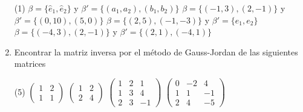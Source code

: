\documentclass[letterpaper,11pt]{article}
\begin{document}
\begin{enumerate}
\begin{tasks}(1)
\task $\beta = \lbrace \hat{e}_{1},\hat{e}_{2} \rbrace$ y $\beta' = \lbrace (a_{1},a_{2}),(b_{1},b_{2}) \rbrace$
\task $\beta = \lbrace (-1,3),(2,-1) \rbrace$ y $\beta' = \lbrace (0,10),(5,0) \rbrace$
\task $\beta = \lbrace (2,5),(-1,-3) \rbrace$ y $\beta' = \lbrace e_{1},e_{2} \rbrace$
\task $\beta = \lbrace (-4,3),(2,-1) \rbrace$ y $\beta' = \lbrace (2,1),(-4,1) \rbrace$
\end{tasks}

\item Encontrar la matriz inversa por el método de Gauss-Jordan de las siguientes matrices 

\begin{tasks}(5)
\task $\begin{pmatrix} 1 & 2 \\ 1 & 1 \end{pmatrix}$     
\task $\begin{pmatrix} 1 & 2 \\ 2 & 4 \end{pmatrix}$ 
\task $\begin{pmatrix} 1 & 2 & 1 \\ 1 & 3 & 4 \\ 2 & 3 & -1 \end{pmatrix}$
\task $\begin{pmatrix} 0 & -2 & 4 \\ 1 & 1 & -1 \\ 2 & 4 & -5 \end{pmatrix}$
\end{tasks}




\end{enumerate}
\end{document}
